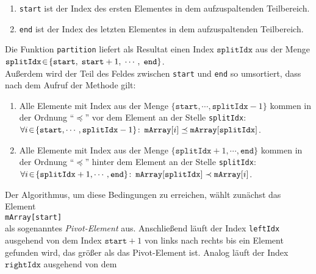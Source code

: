 \begin{enumerate}
      \begin{enumerate}
      \item \texttt{start} ist der Index des ersten  Elementes in dem aufzuspaltenden Teilbereich.
      \item \texttt{end}   ist der Index des letzten Elementes in dem aufzuspaltenden Teilbereich.
      \end{enumerate}
      Die Funktion \texttt{partition} 
      liefert als Resultat einen Index $\mathtt{splitIdx}$ aus der Menge \\[0.2cm]
      \hspace*{1.3cm} 
      $\mathtt{splitIdx} \!\in\! \{ \mathtt{start},\; \mathtt{start}+1,\; \cdots,\; \mathtt{end} \}$.\\[0.2cm]
      Au{\ss}erdem wird der Teil des Feldes zwischen \texttt{start} und \texttt{end} so
      umsortiert, dass nach dem Aufruf der Methode gilt:
      \begin{enumerate}
      \item Alle Elemente mit Index aus der Menge $\{\mathtt{start}, \cdots,
        \mathtt{splitIdx}-1\}$ kommen in der Ordnung
            ``$\preceq$'' vor dem Element an der Stelle \texttt{splitIdx}: \\[0.2cm]
            \hspace*{1.3cm} 
            $\forall i \!\in\! \{\mathtt{start}, \cdots, \mathtt{splitIdx}-1\} \colon\, \mathtt{mArray}[i] \preceq \mathtt{mArray}[\mathtt{splitIdx}]$.
      \item Alle Elemente mit Index aus der Menge $\{\mathtt{splitIdx}+1, \cdots, \mathtt{end}\}$ kommen
            in der Ordnung ``$\preceq$'' hinter dem Element an der Stelle \texttt{splitIdx}: \\[0.2cm]
            \hspace*{1.3cm} 
            $\forall i \!\in\! \{\mathtt{splitIdx}+1, \cdots, \mathtt{end}\} \colon\, \mathtt{mArray}[\mathtt{splitIdx}]\prec \mathtt{mArray}[i]$.
      \end{enumerate}
      Der Algorithmus, um diese Bedingungen zu erreichen,  w\"ahlt zun\"achst das Element
      \\[0.2cm]
      \hspace*{1.3cm}
      \texttt{mArray[start]} 
      \\[0.2cm]
      als sogenanntes \emph{Pivot-Element} aus.  Anschlie{\ss}end l\"auft der Index \texttt{leftIdx} ausgehend von
      dem Index $\texttt{start} + 1$ von links nach rechts bis ein Element gefunden wird, das gr\"o{\ss}er als 
      das Pivot-Element ist. Analog l\"auft der Index $\mathtt{rightIdx}$ ausgehend von dem

\end{enumerate}
